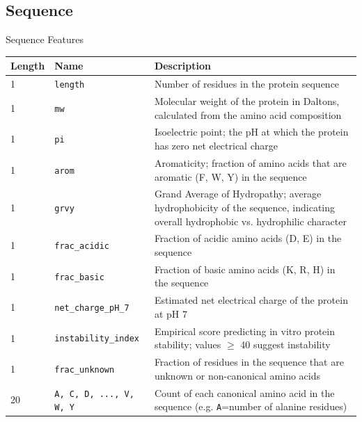 \subsection{Sequence}
\begin{frame}[shrink=10]{Sequence Features}

\begin{longtable}{|p{1.5cm}||p{5cm}|p{12cm}|}
\hline
Length & Name & Description \\[4pt]
\hline
\endhead
1 & \texttt{length} & Number of residues in the protein sequence \\
\hline
1 & \texttt{\gls{mw}} & Molecular weight of the protein in Daltons, calculated from the amino acid composition \\
\hline
1 & \texttt{\gls{pi}} & Isoelectric point; the pH at which the protein has zero net electrical charge  \\
\hline
1 & \texttt{arom} & Aromaticity; fraction of amino acids that are aromatic (F, W, Y) in the sequence  \\
\hline
1 & \texttt{grvy} & Grand Average of Hydropathy; average hydrophobicity of the sequence, indicating overall hydrophobic vs. hydrophilic character \\
\hline
1 &\texttt{frac\_acidic} & Fraction of acidic amino acids (D, E) in the sequence  \\
\hline
1 &\texttt{frac\_basic} & Fraction of basic amino acids (K, R, H) in the sequence  \\
\hline
1 &\texttt{net\_charge\_pH\_7} & Estimated net electrical charge of the protein at pH 7 \\
\hline
1 &\texttt{instability\_index} & Empirical score predicting in vitro protein stability; values $\ge$ 40 suggest instability\\
\hline
1 &\texttt{frac\_unknown} & Fraction of residues in the sequence that are unknown or non-canonical amino acids \\
\hline
20 &\texttt{A, C, D, ..., V, W, Y} & Count of each canonical amino acid in the sequence (e.g. \texttt{A}=number of alanine residues)  \\
\hline
\end{longtable}
\end{frame}


